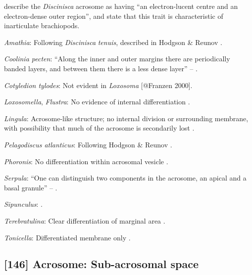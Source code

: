 \documentclass[openany]{book}
\theoremstyle{definition}
\theoremstyle{definition}
\theoremstyle{definition}
\theoremstyle{remark}
\begin{document}
\citet{Hodgson1994Ultrastructureof} describe the \emph{Discinisca}
acrosome as having ``an electron-lucent centre and an electron-dense
outer region'', and state that this trait is characteristic of
inarticulate brachiopods.

\hypertarget{Amathia-coding-145}{}
\emph{Amathia}: Following \emph{Discinisca} \emph{tenuis}, described in
Hodgson \& Reunov \citeyearpar{Hodgson1994Ultrastructureof}.

\hypertarget{Coolinia_pecten-coding-145}{}
\emph{Coolinia pecten}: ``Along the inner and outer margins there are
periodically banded layers, and between them there is a less dense
layer'' -- \citet{Afzelius1978Finestructure}.

\hypertarget{Cotyledion_tylodes-coding-145}{}
\emph{Cotyledion tylodes}: Not evident in \emph{Loxosoma} {[}@Franzen
2000{]}.

\hypertarget{Flustra-coding-145}{}
\emph{Loxosomella}, \emph{Flustra}: No evidence of internal
differentiation \citep[in \emph{Tubulipora};][]{Franzen1984}.

\hypertarget{Lingula-coding-145}{}
\emph{Lingula}: Acrosome-like structure; no internal division or
surrounding membrane, with possibility that much of the acrosome is
secondarily lost \citep{Reunov2004Ultrastructuralstudy}.

\hypertarget{Pelagodiscus_atlanticus-coding-145}{}
\emph{Pelagodiscus atlanticus}: Following Hodgson \& Reunov
\citeyearpar{Hodgson1994Ultrastructureof}.

\hypertarget{Phoronis-coding-145}{}
\emph{Phoronis}: No differentiation within acrosomal vesicle
\citep{Rice1993}.

\hypertarget{Serpula-coding-145}{}
\emph{Serpula}: ``One can distinguish two components in the acrosome, an
apical and a basal granule'' -- \citet{BucklandNicks1988}.

\hypertarget{Sipunculus-coding-145}{}
\emph{Sipunculus}: \citet{Gherardi2011}.

\hypertarget{Terebratulina-coding-145}{}
\emph{Terebratulina}: Clear differentiation of marginal area
\citep{Fukumoto2003Theacrosome}.

\hypertarget{Tonicella-coding-145}{}
\emph{Tonicella}: Differentiated membrane only \citep{DufresneDube1983}.

\subsection*{{[}146{]} Acrosome: Sub-acrosomal
space}\label{acrosome-sub-acrosomal-space}
\end{document}
